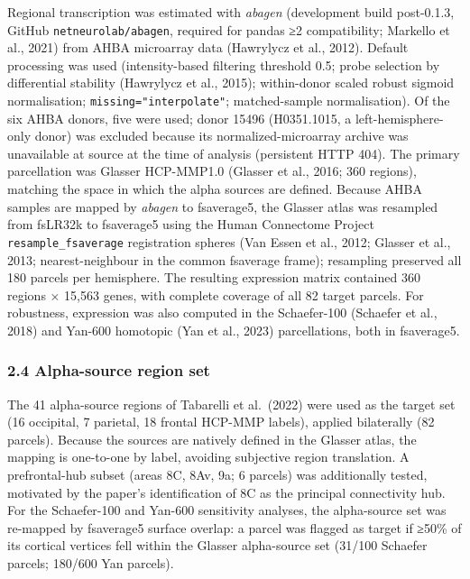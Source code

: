 \documentclass[
  11pt,
  letterpaper,
]{article}
\begin{document}
Regional transcription was estimated with \emph{abagen} (development
build post-0.1.3, GitHub \texttt{netneurolab/abagen}, required for
pandas ≥2 compatibility; Markello et al., 2021) from AHBA microarray
data (Hawrylycz et al., 2012). Default processing was used
(intensity-based filtering threshold 0.5; probe selection by
differential stability (Hawrylycz et al., 2015); within-donor scaled
robust sigmoid normalisation; \texttt{missing="interpolate"};
matched-sample normalisation). Of the six AHBA donors, five were used;
donor 15496 (H0351.1015, a left-hemisphere-only donor) was excluded
because its normalized-microarray archive was unavailable at source at
the time of analysis (persistent HTTP 404). The primary parcellation was
Glasser HCP-MMP1.0 (Glasser et al., 2016; 360 regions), matching the
space in which the alpha sources are defined. Because AHBA samples are
mapped by \emph{abagen} to fsaverage5, the Glasser atlas was resampled
from fsLR32k to fsaverage5 using the Human Connectome Project
\texttt{resample\_fsaverage} registration spheres (Van Essen et al.,
2012; Glasser et al., 2013; nearest-neighbour in the common fsaverage
frame); resampling preserved all 180 parcels per hemisphere. The
resulting expression matrix contained 360 regions × 15,563 genes, with
complete coverage of all 82 target parcels. For robustness, expression
was also computed in the Schaefer-100 (Schaefer et al., 2018) and
Yan-600 homotopic (Yan et al., 2023) parcellations, both in fsaverage5.

\subsubsection{2.4 Alpha-source region
set}\label{alpha-source-region-set}

The 41 alpha-source regions of Tabarelli et al.~(2022) were used as the
target set (16 occipital, 7 parietal, 18 frontal HCP-MMP labels),
applied bilaterally (82 parcels). Because the sources are natively
defined in the Glasser atlas, the mapping is one-to-one by label,
avoiding subjective region translation. A prefrontal-hub subset (areas
8C, 8Av, 9a; 6 parcels) was additionally tested, motivated by the
paper's identification of 8C as the principal connectivity hub. For the
Schaefer-100 and Yan-600 sensitivity analyses, the alpha-source set was
re-mapped by fsaverage5 surface overlap: a parcel was flagged as target
if ≥50\% of its cortical vertices fell within the Glasser alpha-source
set (31/100 Schaefer parcels; 180/600 Yan parcels).
\end{document}

